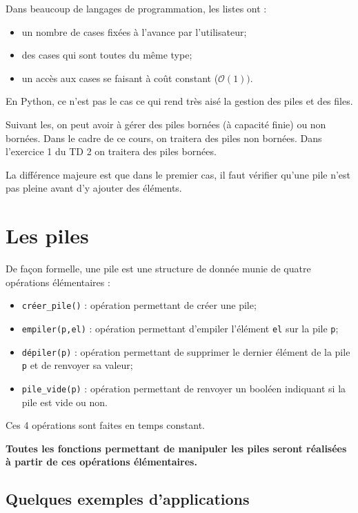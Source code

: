 \documentclass[10pt,fleqn]{article} %
\begin{document}
Dans beaucoup de langages de programmation, les listes ont :
\begin{itemize}
\item un nombre de cases fixées à l'avance par l'utilisateur;
\item des cases qui sont toutes du même type;
\item un accès aux cases se faisant à coût constant ($\mathcal{O}(1))$.
\end{itemize}

En Python, ce n'est pas le cas ce qui rend très aisé la gestion des piles et des files. 

\begin{rem}
 Suivant les, on peut avoir à gérer des piles bornées (à capacité finie) ou non bornées. Dans le cadre de ce cours, on traitera des piles non bornées. Dans l'exercice 1 du TD 2 on traitera des piles bornées. 

La différence majeure est  que dans le premier cas, il faut vérifier qu'une pile n'est pas pleine avant d'y ajouter des éléments. 
\end{rem}

\section{Les piles}
\begin{defi}
De façon formelle, une pile est une structure de donnée munie de quatre opérations élémentaires : 
\begin{itemize}
\item \texttt{créer\_pile()} : opération permettant de créer une pile;
\item \texttt{empiler(p,el)} : opération permettant d'empiler l'élément \texttt{el} sur la pile \texttt{p};
\item \texttt{dépiler(p)} : opération permettant de supprimer le dernier élément de la pile \texttt{p} et de renvoyer sa valeur;
\item \texttt{pile\_vide(p)} : opération permettant de renvoyer un booléen indiquant si la pile est vide ou non.
\end{itemize}
Ces 4 opérations sont faites en temps constant. 

\textbf{Toutes les fonctions permettant de manipuler les piles seront réalisées à partir de ces opérations élémentaires.}
\end{defi}


\subsection{Quelques exemples d'applications}
\end{document}
